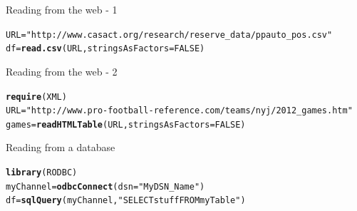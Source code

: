 \documentclass[xcolor=dvipsnames]{beamer}
\makeatletter
\newcommand{\hlnum}[1]{\textcolor[rgb]{0.686,0.059,0.569}{#1}}%
\newcommand{\hlstr}[1]{\textcolor[rgb]{0.192,0.494,0.8}{#1}}%
\newcommand{\hlstd}[1]{\textcolor[rgb]{0.345,0.345,0.345}{#1}}%
\newcommand{\hlkwb}[1]{\textcolor[rgb]{0.69,0.353,0.396}{#1}}%
\newcommand{\hlkwc}[1]{\textcolor[rgb]{0.333,0.667,0.333}{#1}}%
\newcommand{\hlkwd}[1]{\textcolor[rgb]{0.737,0.353,0.396}{\textbf{#1}}}%
\newenvironment{kframe}{%
 \def\at@end@of@kframe{}%
 \ifinner\ifhmode%
  \def\at@end@of@kframe{\end{minipage}}%
  \begin{minipage}{\columnwidth}%
 \fi\fi%
 \def\FrameCommand##1{\hskip\@totalleftmargin \hskip-\fboxsep
 \colorbox{shadecolor}{##1}\hskip-\fboxsep
     \hskip-\linewidth \hskip-\@totalleftmargin \hskip\columnwidth}%
 \MakeFramed {\advance\hsize-\width
   \@totalleftmargin\z@ \linewidth\hsize
   \@setminipage}}%
 {\par\unskip\endMakeFramed%
 \at@end@of@kframe}
\newenvironment{knitrout}{}{} %
\makeatother
\begin{document}
\begin{frame}[fragile]{Reading from the web - 1}
\begin{knitrout}
\color{fgcolor}\begin{kframe}
\begin{alltt}
\hlstd{URL} \hlkwb{=} \hlstr{"http://www.casact.org/research/reserve_data/ppauto_pos.csv"}
\hlstd{df} \hlkwb{=} \hlkwd{read.csv}\hlstd{(URL,} \hlkwc{stringsAsFactors} \hlstd{=} \hlnum{FALSE}\hlstd{)}
\end{alltt}
\end{kframe}
\end{knitrout}

\end{frame}

\begin{frame}[fragile]{Reading from the web - 2}
\begin{knitrout}
\color{fgcolor}\begin{kframe}
\begin{alltt}
\hlkwd{require}\hlstd{(XML)}
\hlstd{URL} \hlkwb{=} \hlstr{"http://www.pro-football-reference.com/teams/nyj/2012_games.htm"}
\hlstd{games} \hlkwb{=} \hlkwd{readHTMLTable}\hlstd{(URL,} \hlkwc{stringsAsFactors} \hlstd{=} \hlnum{FALSE}\hlstd{)}
\end{alltt}
\end{kframe}
\end{knitrout}

\end{frame}

\begin{frame}[fragile]{Reading from a database}
\begin{knitrout}
\color{fgcolor}\begin{kframe}
\begin{alltt}
\hlkwd{library}\hlstd{(RODBC)}
\hlstd{myChannel} \hlkwb{=} \hlkwd{odbcConnect}\hlstd{(}\hlkwc{dsn} \hlstd{=} \hlstr{"MyDSN_Name"}\hlstd{)}
\hlstd{df} \hlkwb{=} \hlkwd{sqlQuery}\hlstd{(myChannel,} \hlstr{"SELECT stuff FROM myTable"}\hlstd{)}
\end{alltt}
\end{kframe}
\end{knitrout}

\end{frame}
\end{document}
